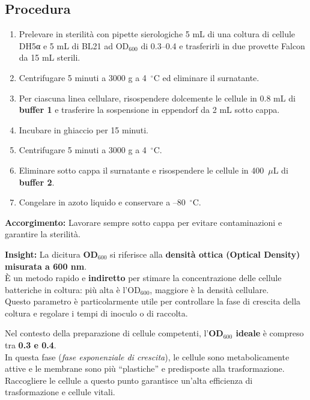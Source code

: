 \newpage
\subsection{Procedura}

\begin{enumerate}
  \item Prelevare in sterilità con pipette sierologiche 5 mL di una coltura di cellule DH5α e 5 mL di BL21 ad OD$_{600}$ di 0.3–0.4 e trasferirli in due provette Falcon da 15 mL sterili.
  \item Centrifugare 5 minuti a 3000 g a 4~$^\circ$C ed eliminare il surnatante.
  \item Per ciascuna linea cellulare, risospendere dolcemente le cellule in 0.8 mL di \textbf{buffer 1} e trasferire la sospensione in eppendorf da 2 mL sotto cappa.
  \item Incubare in ghiaccio per 15 minuti.
  \item Centrifugare 5 minuti a 3000 g a 4~$^\circ$C.
  \item Eliminare sotto cappa il surnatante e risospendere le cellule in 400~$\mu$L di \textbf{buffer 2}.
  \item Congelare in azoto liquido e conservare a –80~$^\circ$C.
\end{enumerate}

\begin{accorgimentoBox}
  \textbf{Accorgimento:} Lavorare sempre sotto cappa per evitare contaminazioni e garantire la sterilità.
\end{accorgimentoBox}


\begin{insightBox}
  \textbf{Insight:} La dicitura \textbf{OD$_{600}$} si riferisce alla \textbf{densità ottica (Optical Density) misurata a 600 nm}.\\
  È un metodo rapido e \textbf{indiretto} per stimare la concentrazione delle cellule batteriche in coltura: più alta è l’OD$_{600}$, maggiore è la densità cellulare.\\
  Questo parametro è particolarmente utile per controllare la fase di crescita della coltura e regolare i tempi di inoculo o di raccolta.

  \vspace{0.5em}

  Nel contesto della preparazione di cellule competenti, l’\textbf{OD$_{600}$ ideale} è compreso tra \textbf{0.3 e 0.4}.\\
  In questa fase (\textit{fase esponenziale di crescita}), le cellule sono metabolicamente attive e le membrane sono più “plastiche” e predisposte alla trasformazione.\\
  Raccogliere le cellule a questo punto garantisce un’alta efficienza di trasformazione e cellule vitali.
\end{insightBox}

